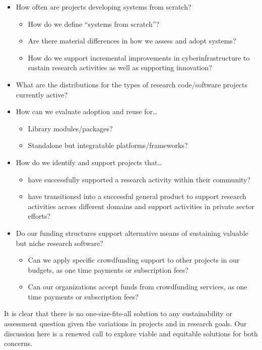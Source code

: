 \documentclass{article}
\begin{document}
\begin{itemize}
\item How often are projects developing systems from scratch?
\begin{itemize}
\item How do we define “systems from scratch”?
\item Are there material differences in how we assess and adopt systems?
\item How do we support incremental improvements in cyberinfrastructure to sustain research activities as well as supporting innovation?
\end{itemize}
\item What are the distributions for the types of research code/software projects currently active?
\item How can we evaluate adoption and reuse for…
\begin{itemize}
\item Library modules/packages?
\item Standalone but integratable platforms/frameworks?
\end{itemize}
\item How do we identify and support projects that…
\begin{itemize}
\item have successfully supported a research activity within their community?
\item have transitioned into a successful general product to support research activities across different domains and support activities in private sector efforts?
\end{itemize}
\item Do our funding structures support alternative means of sustaining valuable but niche research software?
\begin{itemize}
\item Can we apply specific crowdfunding support to other projects in our budgets, as one time payments or subscription fees?
\item Can our organizations accept funds from crowdfunding services, as one time payments or subscription fees?
\end{itemize}
\end{itemize}

It is clear that there is no one-size-fits-all solution to any sustainability or assessment question given the variations in projects and in research goals. Our discussion here is a renewed call to explore viable and equitable solutions for both concerns.
\end{document}
